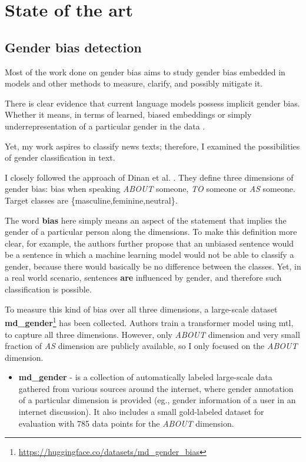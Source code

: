 \chapter{State of the art}

\section{Gender bias detection}\label{gender}
Most of the work done on gender bias aims to study gender bias embedded in models and other methods to measure, clarify, and possibly mitigate it.

There is clear evidence that current language models possess implicit gender bias. Whether it means, in terms of learned, biased embeddings \cite{bolukbasi2016man} or simply underrepresentation of a particular gender in the data \cite{sun-peng-2021-men}. 

Yet, my work aspires to classify news texts; therefore, I examined the possibilities of gender classification in text.

I closely followed the approach of Dinan et al. \cite{dinan2020multi}. They define three dimensions of gender bias: bias when speaking \textit{ABOUT} someone, \textit{TO} someone or \textit{AS} someone. Target classes are \{masculine,feminine,neutral\}. 

The word \textbf{bias} here simply means an aspect of the statement that implies the gender of a particular person along the dimensions. To make this definition more clear, for example, the authors further propose that an unbiased sentence would be a sentence in which a machine learning model would not be able to classify a gender, because there would basically be no difference between the classes. Yet, in a real world scenario, sentences \textbf{are} influenced by gender, and therefore such classification is possible.

To measure this kind of bias over all three dimensions, a large-scale dataset \textbf{md\_gender}\footnote{\url{https://huggingface.co/datasets/md_gender_bias}} has been collected. Authors train a transformer model using \Gls{mtl}, to capture all three dimensions. However, only \textit{ABOUT} dimension and very small fraction of \textit{AS} dimension are publicly available, so I only focused on the \textit{ABOUT} dimension.

\begin{itemize}
\item \textbf{md\_gender} - is a collection of automatically labeled large-scale data gathered from various sources around the internet, where gender annotation of a particular dimension is provided (eg., gender information of a user in an internet discussion). It also includes a small gold-labeled dataset for evaluation with 785 data points for the \textit{ABOUT} dimension.
\end{itemize}

